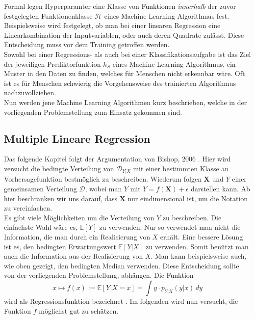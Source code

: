 Formal legen Hyperparamter eine Klasse von Funktionen \textit{innerhalb} der zuvor festgelegten Funktionenklasse $\mathcal{H}$ eines Machine
Learning Algorithmus fest. Beispielsweise wird festgelegt, ob man bei einer linearen Regression eine Linearkombination der Inputvariablen, oder auch deren Quadrate
zul\"asst. Diese Entscheidung muss vor dem Training getroffen werden. \\


Sowohl bei einer Regressions- als auch bei einer Klassifikationsaufgabe ist das Ziel der jeweiligen Prediktorfunktion $h_S$ eines Machine Learning Algorithmus,
ein Muster in den Daten zu finden, welches f\"ur Menschen nicht erkennbar w\"are. Oft ist es f\"ur Menschen schwierig die Vorgehensweise des trainierten Algorithmus
nachzuvollziehen. \\

Nun werden jene Machine Learning Algorithmen kurz beschrieben, welche in der vorliegenden Problemstellung zum Einsatz gekommen sind.





























\subsection{Multiple Lineare Regression}

Das folgende Kapitel folgt der Argumentation von Bishop, 2006 \cite[Kapitel 3.1]{bishop}. Hier wird versucht die bedingte Verteilung von $\mathcal{D}_{Y|X}$ mit einer bestimmten Klasse an Vorhersagefunktion bestm\"oglich zu beschreiben.
Wiederum folgen $\mathbf{X}$ und $Y$ einer gemeinsamen Verteilung $\mathcal{D}$, wobei man $Y$ mit $Y = f(\mathbf{X}) + \epsilon$ darstellen kann.
Ab hier beschränken wir uns darauf, dass $\mathbf{X}$ nur eindimensional ist, um die Notation zu vereinfachen. \\

Es gibt viele M\"oglichkeiten um die Verteilung von $Y$ zu beschreiben. Die einfachste Wahl w\"are es, $\mathbb{E}[Y]$ zu verwenden. Nur so verwendet man nicht die
Information, die man durch ein Realisierung von $X$ erh\"alt. Eine bessere L\"osung ist es, den bedingten Erwartungswert $\mathbb{E}[Y|X]$ zu verwenden. Somit ben\"utzt man auch die Information aus der
Realisierung von $X$. Man kann beispielsweise auch, wie oben gezeigt, den bedingten Median verwenden. Diese Entscheidung sollte von der vorliegenden Problemstellung,
abh\"angen. Die Funktion
$$ x \mapsto f(x) := \mathbb{E}[Y|X = x] = \int y \cdot p_{Y|X}(y|x) \,dy $$
wird als Regressionsfunktion bezeichnet \cite[Seite 209]{wasserman}. Im folgenden wird nun versucht, die Funktion $f$ m\"oglichst gut zu sch\"atzen.\\

